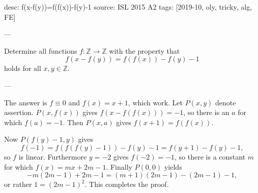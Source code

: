 desc: f(x-f(y))=f(f(x))-f(y)-1
source: ISL 2015 A2
tags: [2019-10, oly, tricky, alg, FE]

---

Determine all functions $f:\mathbb Z\to\mathbb Z$ with the property that \[f(x-f(y))=f(f(x))-f(y)-1\]
holds for all $x,y\in\mathbb Z$.

---

The answer is $f\equiv0$ and $f(x)=x+1$, which work. Let $P(x,y)$ denote assertion. $P(x,f(x))$ gives $f(x-f(f(x)))=-1$, so there is an $a$ for which $f(a)=-1$. Then $P(x,a)$ gives $f(x+1)=f(f(x))$.

Now $P(f(y)-1,y)$ gives \[f(-1)=f(f(f(y)-1))-f(y)-1=f(y+1)-f(y)-1,\]
so $f$ is linear. Furthermore $y=-2$ gives $f(-2)=-1$, so there is a constant $m$ for which $f(x)=mx+2m-1$. Finally $P(0,0)$ yields \[-m(2m-1)+2m-1=(m+1)(2m-1)-(2m-1)-1,\]
or rather $1=(2m-1)^2$. This completes the proof.
